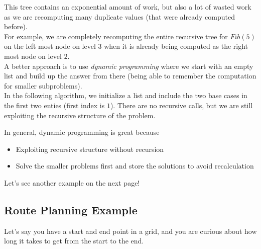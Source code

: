 \documentclass[14pt]{extarticle}
\begin{document}
    This tree contains an exponential amount of work, but also a lot of
    wasted work as we are recomputing many duplicate values (that were
    already computed before).\\

    For example, we are completely recomputing the entire recursive
    tree for $Fib(5)$ on the left most node on level $3$ when it is already
    being computed as the right most node on level $2$.\\

    A better approach is to use \textit{dynamic programming} where we start
    with an empty list and build up the answer from there (being able to 
    remember the computation for smaller subproblems).\\

    In the following algorithm, we initialize a list and include the two
    base cases in the first two enties (first index is $1$). There are no
    recursive calls, but we are still exploiting the recursive structure
    of the problem.

    \begin{algorithm}[H]
    \end{algorithm}

    \vspace{3mm}
    In general, dynamic programming is great because
    \begin{itemize}
        \item Exploiting recursive structure without recursion
        \item Solve the smaller problems first and store the solutions
            to avoid recalculation
    \end{itemize}
    \vspace{6mm}

    Let's see another example on the next page!

    \pagebreak

    \subsection*{Route Planning Example}
    Let's say you have a start and end point in a grid, and you are curious
    about how long it takes to get from the start to the end.\\
\end{document}
